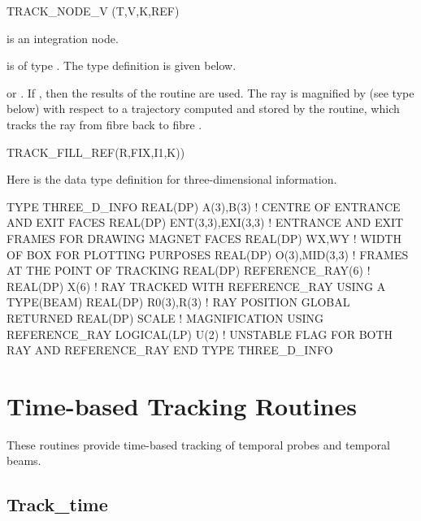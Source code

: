 \begin{ptccode}
TRACK_NODE_V (T,V,K,REF)
\end{ptccode}

 is an integration node.

 is of type . The type definition is given below.

%
 or . If , then the results of the
 routine are used. The ray is magnified by 
 (see type  below) with respect to a
trajectory computed and stored by the  routine,
which tracks the ray  from fibre  back to fibre .

\begin{ptccode}
TRACK_FILL_REF(R,FIX,I1,K))
\end{ptccode}

%
Here is the data type definition for three-dimensional information.

\begin{ptccode}
TYPE THREE_D_INFO
  REAL(DP) A(3),B(3)         ! CENTRE OF ENTRANCE AND EXIT FACES
  REAL(DP) ENT(3,3),EXI(3,3) ! ENTRANCE AND EXIT FRAMES FOR DRAWING MAGNET FACES
  REAL(DP) WX,WY             ! WIDTH OF BOX FOR PLOTTING PURPOSES
  REAL(DP) O(3),MID(3,3)     ! FRAMES AT THE POINT OF TRACKING
  REAL(DP) REFERENCE_RAY(6)  !
  REAL(DP) X(6)              ! RAY TRACKED WITH REFERENCE_RAY USING A TYPE(BEAM)
  REAL(DP) R0(3),R(3)        ! RAY POSITION GLOBAL RETURNED
  REAL(DP) SCALE             ! MAGNIFICATION USING REFERENCE_RAY
  LOGICAL(LP) U(2)           ! UNSTABLE FLAG FOR BOTH RAY AND REFERENCE_RAY
END TYPE THREE_D_INFO
\end{ptccode}


\section{Time-based Tracking Routines}

%
These routines provide time-based tracking of temporal probes and temporal beams.


\subsection{Track\_time}

